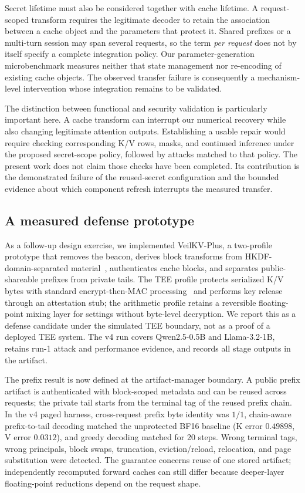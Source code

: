 Secret lifetime must also be considered together with cache lifetime. A request-scoped transform requires the legitimate decoder to retain the association between a cache object and the parameters that protect it. Shared prefixes or a multi-turn session may span several requests, so the term \emph{per request} does not by itself specify a complete integration policy. Our parameter-generation microbenchmark measures neither that state management nor re-encoding of existing cache objects. The observed transfer failure is consequently a mechanism-level intervention whose integration remains to be validated.

The distinction between functional and security validation is particularly important here. A cache transform can interrupt our numerical recovery while also changing legitimate attention outputs. Establishing a usable repair would require checking corresponding K/V rows, masks, and continued inference under the proposed secret-scope policy, followed by attacks matched to that policy. The present work does not claim those checks have been completed. Its contribution is the demonstrated failure of the reused-secret configuration and the bounded evidence about which component refresh interrupts the measured transfer.

\subsection{A measured defense prototype}
\label{sec:veilkv}
As a follow-up design exercise, we implemented VeilKV-Plus, a two-profile prototype that removes the beacon, derives block transforms from HKDF-domain-separated material~\cite{hkdf}, authenticates cache blocks, and separates public-shareable prefixes from private tails. The TEE profile protects serialized K/V bytes with standard encrypt-then-MAC processing~\cite{etm} and performs key release through an attestation stub; the arithmetic profile retains a reversible floating-point mixing layer for settings without byte-level decryption. We report this as a defense candidate under the simulated TEE boundary, not as a proof of a deployed TEE system. The v4 run covers Qwen2.5-0.5B and Llama-3.2-1B, retains run-1 attack and performance evidence, and records all stage outputs in the artifact.

The prefix result is now defined at the artifact-manager boundary. A public prefix artifact is authenticated with block-scoped metadata and can be reused across requests; the private tail starts from the terminal tag of the reused prefix chain. In the v4 paged harness, cross-request prefix byte identity was $1/1$, chain-aware prefix-to-tail decoding matched the unprotected BF16 baseline (K error $0.49898$, V error $0.0312$), and greedy decoding matched for 20 steps. Wrong terminal tags, wrong principals, block swaps, truncation, eviction/reload, relocation, and page substitution were detected. The guarantee concerns reuse of one stored artifact; independently recomputed forward caches can still differ because deeper-layer floating-point reductions depend on the request shape.

